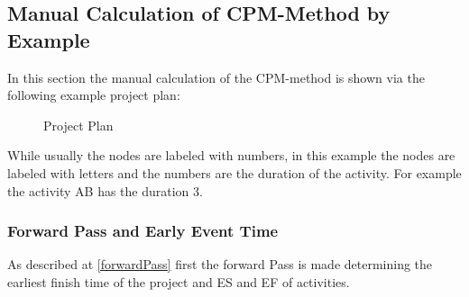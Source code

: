 \subsection{Manual Calculation of CPM-Method by Example}
In this section the manual calculation of the CPM-method is shown via the following example project plan:
\begin{figure}[h] 
\centerline{}
\caption{Project Plan}
\label{pic:plan1}
\end{figure}
While usually the nodes are labeled with numbers, in this example the nodes are labeled with letters and the numbers are the duration of the activity. For example the activity AB has the duration 3.

\subsubsection{Forward Pass and Early Event Time}
As described at \ref{forwardPass} first the forward Pass is made determining the earliest finish time of the project and ES and EF of activities.

